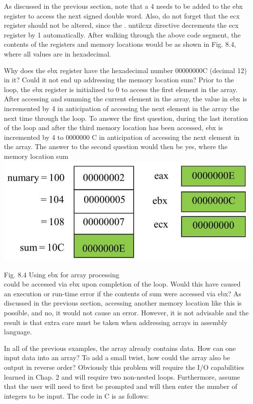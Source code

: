 \documentclass[10pt]{article}
\begin{document}
As discussed in the previous section, note that a 4 needs to be added to the ebx register to access the next signed double word. Also, do not forget that the ecx register should not be altered, since the . untilcxz directive decrements the ecx register by 1 automatically. After walking through the above code segment, the contents of the registers and memory locations would be as shown in Fig. 8.4, where all values are in hexadecimal.

Why does the ebx register have the hexadecimal number 00000000C (decimal 12) in it? Could it not end up addressing the memory location sum? Prior to the loop, the ebx register is initialized to 0 to access the first element in the array. After accessing and summing the current element in the array, the value in ebx is incremented by 4 in anticipation of accessing the next element in the array the next time through the loop. To answer the first question, during the last iteration of the loop and after the third memory location has been accessed, ebx is incremented by 4 to 0000000 C in anticipation of accessing the next element in the array. The answer to the second question would then be yes, where the memory location sum\\
\includegraphics[max width=\textwidth, center]{2025_03_24_ebe50cc223a6fbc49eecg-175}

Fig. 8.4 Using ebx for array processing\\
could be accessed via ebx upon completion of the loop. Would this have caused an execution or run-time error if the contents of sum were accessed via ebx? As discussed in the previous section, accessing another memory location like this is possible, and no, it would not cause an error. However, it is not advisable and the result is that extra care must be taken when addressing arrays in assembly language.

In all of the previous examples, the array already contains data. How can one input data into an array? To add a small twist, how could the array also be output in reverse order? Obviously this problem will require the I/O capabilities learned in Chap. 2 and will require two non-nested loops. Furthermore, assume that the user will need to first be prompted and will then enter the number of integers to be input. The code in C is as follows:
\end{document}
